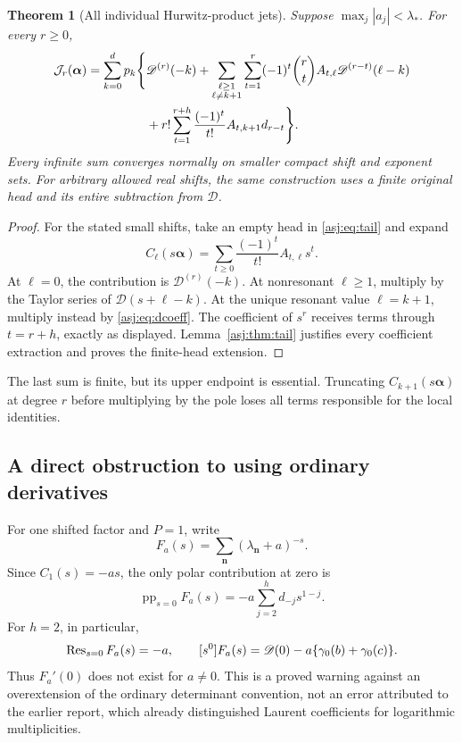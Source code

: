 \documentclass[11pt]{article}
\numberwithin{equation}{section}
\newtheorem{theorem}{Theorem}[section]
\theoremstyle{definition}\newtheorem{definition}[theorem]{Definition}
\theoremstyle{remark}\newtheorem{remark}[theorem]{Remark}\newtheorem{example}[theorem]{Example}
\newcommand{\D}{\mathscr D}\newcommand{\calH}{\mathcal H}\newcommand{\calR}{\mathcal R}
\newcommand{\calJ}{\mathcal J}\newcommand{\calZ}{\mathcal Z}
\begin{document}
\begin{theorem}[All individual Hurwitz-product jets]\label{asj:thm:alljets}
Suppose $\max_j|a_j|<\lambda_*$. For every $r\ge0$,
\begin{align}\label{asj:eq:alljets}
 \calJ_r(\boldsymbol\alpha)
 =\sum_{k=0}^d p_k\Bigg\{&\D^{(r)}(-k)
  +\sum_{\substack{\ell\ge1\\\ell\ne k+1}}\sum_{t=1}^r
    (-1)^t\binom rt A_{t,\ell}\D^{(r-t)}(\ell-k)\notag\\
 &+r!\sum_{t=1}^{r+h}\frac{(-1)^t}{t!}
                       A_{t,k+1}d_{r-t}\Bigg\}.
\end{align}
Every infinite sum converges normally on smaller compact shift and
exponent sets. For arbitrary allowed real shifts, the same construction
uses a finite original head and its entire subtraction from $\D$.
\end{theorem}
\begin{proof}
For the stated small shifts, take an empty head in \eqref{asj:eq:tail} and
expand
\[
 C_\ell(s\boldsymbol\alpha)
     =\sum_{t\ge0}\frac{(-1)^t}{t!}A_{t,\ell}s^t.
\]
At $\ell=0$, the contribution is $\D^{(r)}(-k)$. At nonresonant
$\ell\ge1$, multiply by the Taylor series of $\D(s+\ell-k)$.
At the unique resonant value $\ell=k+1$, multiply instead by
\eqref{asj:eq:dcoeff}. The coefficient of $s^r$ receives terms through
$t=r+h$, exactly as displayed. Lemma~\ref{asj:thm:tail} justifies every
coefficient extraction and proves the finite-head extension.
\end{proof}

The last sum is finite, but its upper endpoint is essential. Truncating
$C_{k+1}(s\boldsymbol\alpha)$ at degree $r$ before multiplying by the
pole loses all terms responsible for the local identities.

\subsection{A direct obstruction to using ordinary derivatives}
For one shifted factor and $P=1$, write
\[
 F_a(s)=\sum_{\boldsymbol n}(\lambda_{\boldsymbol n}+a)^{-s}.
\]
Since $C_1(s)=-as$, the only polar contribution at zero is
\begin{equation}\label{asj:eq:Fpolar}
 \operatorname{pp}_{s=0}F_a(s)
       =-a\sum_{j=2}^h d_{-j}s^{1-j}.
\end{equation}
For $h=2$, in particular,
\begin{equation}\label{asj:eq:doublepole-example}
 \Res_{s=0}F_a(s)=-a,\qquad
 [s^0]F_a(s)=\D(0)-a\{\gamma_0(b)+\gamma_0(c)\}.
\end{equation}
Thus $F_a'(0)$ does not exist for $a\ne0$. This is a proved warning
against an overextension of the ordinary determinant convention, not
an error attributed to the earlier report, which already distinguished
Laurent coefficients for logarithmic multiplicities.
\end{document}
